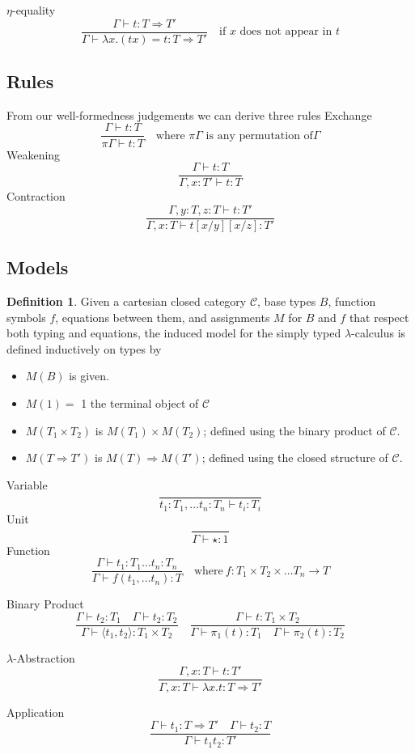 \documentclass{article}
\theoremstyle{definition}
\newtheorem{definition}{Definition}[section]
\newcommand{\C}{\mathcal{C}}
\begin{document}
$\eta$-equality
$$
\frac
{\Gamma \vdash t : T \Rightarrow T\prime}
{\Gamma \vdash \lambda x.(tx) = t : T \Rightarrow T\prime}
\quad
\textrm{if $x$ does not appear in $t$}
$$

\subsection{Rules}
From our well-formedness judgements we can derive three rules
\vspace{4mm}
Exchange
$$
\frac
{\Gamma \vdash t : T}
{\pi\Gamma \vdash t : T}
\quad
\textrm{where }
\pi \Gamma
\textrm{ is any permutation of}
\Gamma
$$
Weakening
$$
\frac
{\Gamma \vdash t : T}
{\Gamma, x : T\prime \vdash t : T}
$$
Contraction
$$
\frac
{\Gamma, y : T, z : T \vdash t : T\prime}
{\Gamma, x : T \vdash t[x/y][x/z] : T\prime}
$$

\subsection{Models}
\begin{definition}
    Given a cartesian closed category $\C$,
    base types $B$,
    function symbols $f$,
    equations between them,
    and assignments $M$ for $B$ and $f$ that respect both typing and equations,
    the induced model for the simply typed $\lambda$-calculus is defined inductively on types by
    \begin{itemize}
        \item $M(B)$ is given.
        \item $M(1) =$ 1 the terminal object of $\C$
        \item $M(T_1 \times T_2)$ is $M(T_1) \times M(T_2)$;
            defined using the binary product of $\C$.
        \item $M(T \Rightarrow T\prime)$ is $M(T) \Rightarrow M(T\prime)$;
            defined using the closed structure of $\C$.
    \end{itemize}
    Variable
    $$
    \frac{}{t_1 : T_1, \dots t_n : T_n \vdash t_i : T_i}
    $$
    Unit
    $$
    \frac{}{\Gamma \vdash \star : 1}
    $$
    Function
    $$
    \frac{\Gamma \vdash t_1 : T_1 \dots t_n : T_n}{\Gamma \vdash f(t_1,\dots t_n) : T}
    \quad\textrm{where}\ f : T_1 \times T_2 \times \dots T_n \rightarrow T
    $$

    Binary Product
    $$
    \frac
    {\Gamma \vdash t_2 : T_1 \quad \Gamma \vdash t_2 : T_2}
    {\Gamma \vdash \langle t_1, t_2 \rangle : T_1 \times T_2}
    \quad
    \frac
    {\Gamma \vdash t : T_1 \times T_2}
    {\Gamma \vdash \pi_1(t) : T_1 \quad \Gamma \vdash \pi_2(t) : T_2}
    $$

    $\lambda$-Abstraction
    $$
    \frac
    {\Gamma, x : T \vdash t : T\prime}
    {\Gamma, x : T \vdash \lambda x.t : T \Rightarrow T\prime}
    $$

    Application
    $$
    \frac
    {\Gamma \vdash t_1 : T \Rightarrow T\prime \quad \Gamma \vdash t_2 : T}
    {\Gamma \vdash t_1 t_2 : T\prime}
    $$
\end{definition}
\end{document}
